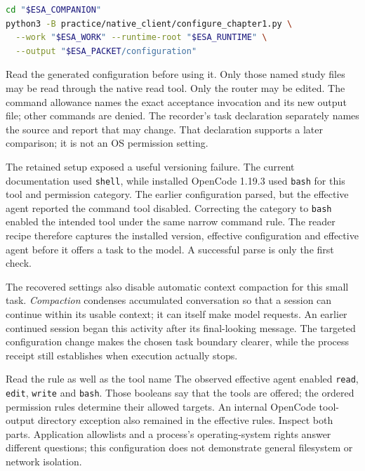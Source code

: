 \begin{lstlisting}[language=bash]
cd "$ESA_COMPANION"
python3 -B practice/native_client/configure_chapter1.py \
  --work "$ESA_WORK" --runtime-root "$ESA_RUNTIME" \
  --output "$ESA_PACKET/configuration"
\end{lstlisting}

Read the generated configuration before using it. Only those named study files may be read through the native read tool. Only the router may be edited. The command allowance names the exact acceptance invocation and its new output file; other commands are denied. The recorder's task declaration separately names the source and report that may change. That declaration supports a later comparison; it is not an OS permission setting.

The retained setup exposed a useful versioning failure. The current documentation used \texttt{shell}, while installed OpenCode 1.19.3 used \texttt{bash} for this tool and permission category. The earlier configuration parsed, but the effective agent reported the command tool disabled. Correcting the category to \texttt{bash} enabled the intended tool under the same narrow command rule. The reader recipe therefore captures the installed version, effective configuration and effective agent before it offers a task to the model. A successful parse is only the first check.

The recovered settings also disable automatic context compaction for this small task. \emph{Compaction} condenses accumulated conversation so that a session can continue within its usable context; it can itself make model requests. An earlier continued session began this activity after its final-looking message. The targeted configuration change makes the chosen task boundary clearer, while the process receipt still establishes when execution actually stops.

\begin{readerbox}{Read the rule as well as the tool name}
The observed effective agent enabled \texttt{read}, \texttt{edit}, \texttt{write} and \texttt{bash}. Those booleans say that the tools are offered; the ordered permission rules determine their allowed targets. An internal OpenCode tool-output directory exception also remained in the effective rules. Inspect both parts. Application allowlists and a process's operating-system rights answer different questions; this configuration does not demonstrate general filesystem or network isolation.
\end{readerbox}

